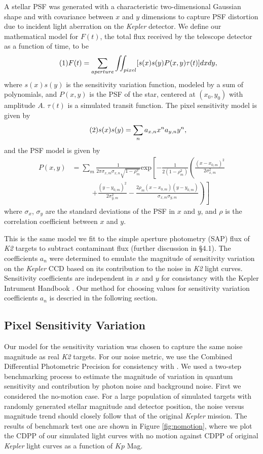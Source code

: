 \documentclass[12pt,preprint]{aastex}
\begin{document}
A stellar PSF was generated with a characteristic two-dimensional Gaussian shape and with covariance between $x$ and $y$ dimensions to capture PSF distortion due to incident light aberration on the \textit{Kepler} detector. We define our mathematical model for $F(t)$, the total flux received by the telescope detector as a function of time, to be
%
\[
\tag{1}
F(t)=\sum_{aperture} \iint_{pixel} [s(x)s(y)P(x,y)\tau (t)]dxdy,\\
\]
%
where $s(x)s(y)$ is the sensitivity variation function, modeled by a sum of polynomials, and $P(x,y)$ is the PSF of the star, centered at $(x_0,y_0)$ with amplitude $A$. $\tau (t)$ is a simulated transit function. The pixel sensitivity model is given by
%
\[
\tag{2}
s(x)s(y) = \sum_n a_{x,n}x^na_{y,n}y^n, \\
\]
%
and the PSF model is given by
%
\[
\tag{3}
\begin{split}
P(x,y) & = \sum_m \frac{1}{2\pi\sigma_{x,m}\sigma_{x,n}\sqrt{1-\rho_m^2}} \text{exp}\left[ -\frac{1}{2(1-\rho_m^2)} \left( \frac{(x-x_{0,m})^2}{2\sigma_{x,m}^2} \right. \right. \\
			 & \phantom{xxxxx} \left. \left. + \frac{(y-y_{0,m})^2}{2\sigma_{y,m}^2} - \frac{2\rho_m  (x-x_{0,m})(y-y_{0,m})}{\sigma_{x,m}\sigma_{y,m}} \right) \right]
\end{split}
\]
%
where $\sigma_x$, $\sigma_y$ are the standard deviations of the PSF in $x$ and $y$, and $\rho$ is the correlation coefficient between $x$ and $y$.

This is the same model we fit to the simple aperture photometry (SAP) flux of \textit{K2} targets to subtract contaminant flux (further discussion in \S 4.1). The coefficients $a_n$ were determined to emulate the magnitude of sensitivity variation on the \textit{Kepler} CCD based on its contribution to the noise in \textit{K2} light curves. Sensitivity coefficients are independent in $x$ and $y$ for consistancy with the Kepler Intrument Handbook \citep{kepler_intrument_handbook}. Our method for choosing values for sensitivity variation coefficients $a_n$ is descried in the following section.

\subsection{Pixel Sensitivity Variation}

Our model for the sensitivity variation was chosen to capture the same noise magnitude as real \textit{K2} targets. For our noise metric, we use the Combined Differential Photometric Precision for consistency with \cite{2016AJ....152..100L}. We used a two-step benchmarking process to estimate the magnitude of variation in quantum sensitivity and contribution by photon noise and background noise. First we considered the no-motion case. For a large population of simulated targets with randomly generated stellar magnitude and detector position, the noise versus magnitude trend should closely follow that of the original \textit{Kepler} mission. The results of  benchmark test one are shown in Figure \ref{fig:nomotion}, where we plot the CDPP of our simulated light curves with no motion against CDPP of original \textit{Kepler} light curves as a function of $Kp$ Mag.
\end{document}
